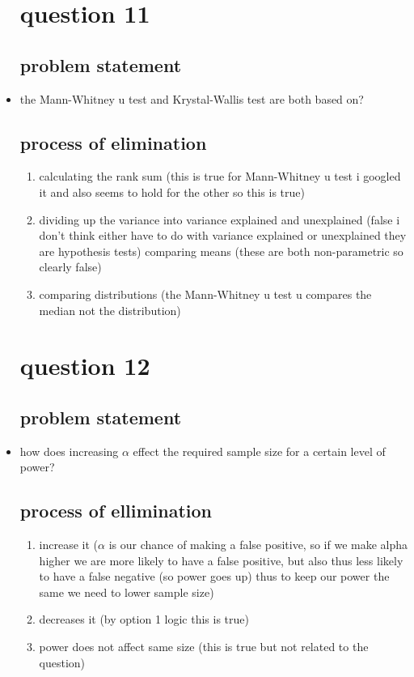 \documentclass{article}
\begin{document}
\begin{itemize}
\section{question 11 }
\subsection{problem statement}
\item the Mann-Whitney u test and Krystal-Wallis test are both based on?
\subsection{process of elimination}
\begin{enumerate}
    \item calculating the rank sum (this is true for Mann-Whitney u test i googled it and also seems to hold for the other so this is true) 
    \item dividing up the variance into variance explained and unexplained (false i don't think either have to do with variance explained or unexplained they are hypothesis tests)
    \itme comparing means (these are both non-parametric so clearly false)
    \item comparing distributions (the Mann-Whitney u test u compares the median not the distribution) 
\end{enumerate}

\section{question 12}
\subsection{problem statement}
\item how does increasing $\alpha$ effect the required sample size for a certain level of power? 
\subsection{process of ellimination}
\begin{enumerate}
    \item increase it ($\alpha$ is our chance of making a false positive, so if we make alpha higher we are more likely to have a false positive, but also thus less likely to have a false negative (so power goes up) thus to keep our power the same we need to lower sample size) 
    \item decreases it  (by option 1 logic this is true) 
    \item power does not affect same size (this is true but not related to the question) 
\end{enumerate}

\end{itemize}
\end{document}
